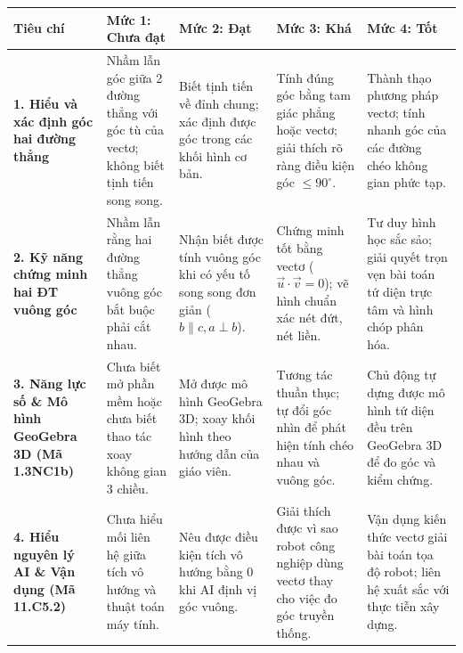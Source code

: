 \documentclass[12pt, a4paper]{article}
\renewcommand{\vec}[1]{\overrightarrow{#1}}
\begin{document}
\begin{center}
\begin{tabularx}{\textwidth}{|p{2.8cm}|X|X|X|X|}
    \hline
    \textbf{Tiêu chí} & \textbf{Mức 1: Chưa đạt} & \textbf{Mức 2: Đạt} & \textbf{Mức 3: Khá} & \textbf{Mức 4: Tốt} \\ \hline
    \textbf{1. Hiểu và xác định góc hai đường thẳng} & Nhầm lẫn góc giữa 2 đường thẳng với góc tù của vectơ; không biết tịnh tiến song song. & Biết tịnh tiến về đỉnh chung; xác định được góc trong các khối hình cơ bản. & Tính đúng góc bằng tam giác phẳng hoặc vectơ; giải thích rõ ràng điều kiện góc $\le 90^\circ$. & Thành thạo phương pháp vectơ; tính nhanh góc của các đường chéo không gian phức tạp. \\ \hline
    \textbf{2. Kỹ năng chứng minh hai ĐT vuông góc} & Nhầm lẫn rằng hai đường thẳng vuông góc bắt buộc phải cắt nhau. & Nhận biết được tính vuông góc khi có yếu tố song song đơn giản ($b \parallel c, a \perp b$). & Chứng minh tốt bằng vectơ ($\vec{u} \cdot \vec{v} = 0$); vẽ hình chuẩn xác nét đứt, nét liền. & Tư duy hình học sắc sảo; giải quyết trọn vẹn bài toán tứ diện trực tâm và hình chóp phân hóa. \\ \hline
    \textbf{3. Năng lực số \& Mô hình GeoGebra 3D (Mã 1.3NC1b)} & Chưa biết mở phần mềm hoặc chưa biết thao tác xoay không gian 3 chiều. & Mở được mô hình GeoGebra 3D; xoay khối hình theo hướng dẫn của giáo viên. & Tương tác thuần thục; tự đổi góc nhìn để phát hiện tính chéo nhau và vuông góc. & Chủ động tự dựng được mô hình tứ diện đều trên GeoGebra 3D để đo góc và kiểm chứng. \\ \hline
    \textbf{4. Hiểu nguyên lý AI \& Vận dụng (Mã 11.C5.2)} & Chưa hiểu mối liên hệ giữa tích vô hướng và thuật toán máy tính. & Nêu được điều kiện tích vô hướng bằng 0 khi AI định vị góc vuông. & Giải thích được vì sao robot công nghiệp dùng vectơ thay cho việc đo góc truyền thống. & Vận dụng kiến thức vectơ giải bài toán tọa độ robot; liên hệ xuất sắc với thực tiễn xây dựng. \\ \hline
\end{tabularx}
\end{center}
\end{document}

